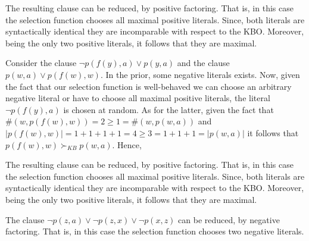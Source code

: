 \documentclass[11pt,a4paper]{article}
\begin{document}
The resulting clause can be reduced, by positive factoring. That is, in this case the selection function chooses all maximal positive literals. 
Since, both literals are syntactically identical they are incomparable with respect to the KBO. Moreover, being the only two positive literals, it follows that they are maximal. 
\begin{prooftree}
\end{prooftree}

Consider the clause $\neg p(f(y), a)  \lor p(y, a)$ and the clause $p(w, a) \lor p(f (w), w)$. In the prior, some negative literals exists. Now, given the fact that our selection function is well-behaved we can choose an arbitrary negative literal or have to choose all maximal  positive literals, the literal  $\neg p(f(y), a)$ is chosen at random. As for the latter, given the fact that $\#(w,p(f(w), w))=2 \geq 1=\#(w,p(w, a))$ and $|p(f(w),w)|=1+1+1+1=4 \geq  3=1+1+1 = | p(w, a)|$ it follows that $p(f(w),w) \succ_{KB} p(w,a)$. Hence,
\begin{prooftree}
\end{prooftree}


The resulting clause can be reduced, by positive factoring. That is, in this case the selection function chooses all maximal positive literals. 
Since, both literals are syntactically identical they are incomparable with respect to the KBO. Moreover, being the only two positive literals, it follows that they are maximal. 
\begin{prooftree}
\end{prooftree}


The clause $\neg p(z, a) \lor \neg p(z, x) \lor \neg p(x, z)$ can be reduced, by negative factoring. That is, in this case the selection function chooses two negative literals.

\begin{prooftree}
\end{prooftree}
\end{document}

